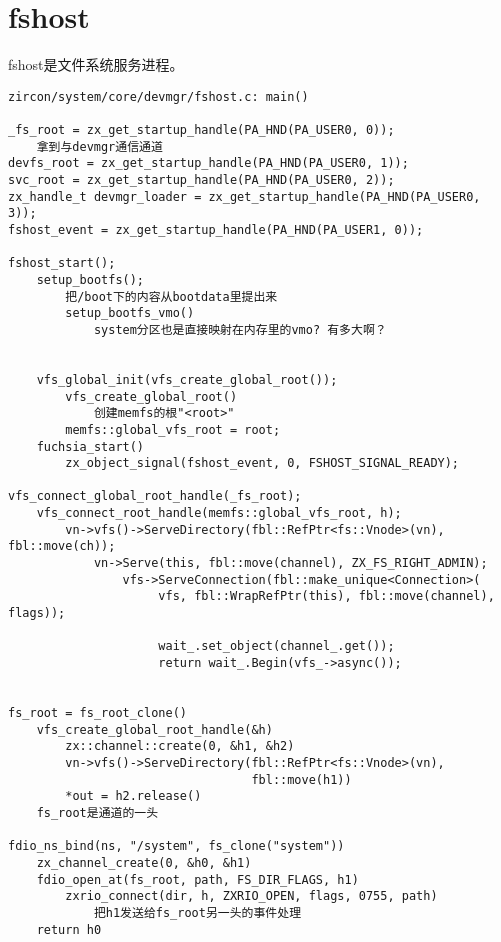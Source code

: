 \section{fshost}

fshost是文件系统服务进程。

\begin{verbatim}
zircon/system/core/devmgr/fshost.c: main()

_fs_root = zx_get_startup_handle(PA_HND(PA_USER0, 0));
    拿到与devmgr通信通道
devfs_root = zx_get_startup_handle(PA_HND(PA_USER0, 1));
svc_root = zx_get_startup_handle(PA_HND(PA_USER0, 2));
zx_handle_t devmgr_loader = zx_get_startup_handle(PA_HND(PA_USER0, 3));
fshost_event = zx_get_startup_handle(PA_HND(PA_USER1, 0));

fshost_start();
    setup_bootfs();
        把/boot下的内容从bootdata里提出来
        setup_bootfs_vmo()
            system分区也是直接映射在内存里的vmo? 有多大啊？


    vfs_global_init(vfs_create_global_root());
        vfs_create_global_root()
            创建memfs的根"<root>"
        memfs::global_vfs_root = root;
    fuchsia_start()
        zx_object_signal(fshost_event, 0, FSHOST_SIGNAL_READY);

vfs_connect_global_root_handle(_fs_root);
    vfs_connect_root_handle(memfs::global_vfs_root, h);
        vn->vfs()->ServeDirectory(fbl::RefPtr<fs::Vnode>(vn), fbl::move(ch));
            vn->Serve(this, fbl::move(channel), ZX_FS_RIGHT_ADMIN);
                vfs->ServeConnection(fbl::make_unique<Connection>(
                     vfs, fbl::WrapRefPtr(this), fbl::move(channel), flags));

                     wait_.set_object(channel_.get());
                     return wait_.Begin(vfs_->async());


fs_root = fs_root_clone()
    vfs_create_global_root_handle(&h)
        zx::channel::create(0, &h1, &h2)
        vn->vfs()->ServeDirectory(fbl::RefPtr<fs::Vnode>(vn),
                                  fbl::move(h1))
        *out = h2.release()                         
    fs_root是通道的一头

fdio_ns_bind(ns, "/system", fs_clone("system"))
    zx_channel_create(0, &h0, &h1)
    fdio_open_at(fs_root, path, FS_DIR_FLAGS, h1)
        zxrio_connect(dir, h, ZXRIO_OPEN, flags, 0755, path)
            把h1发送给fs_root另一头的事件处理
    return h0
\end{verbatim}